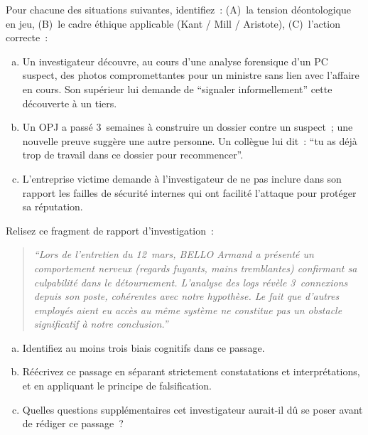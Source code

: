 \bigskip

\begin{boxexo}[title={\ding{45}\quad Exercice~13.1. Identification éthique \niveaubase}]
Pour chacune des situations suivantes, identifiez~: (A)~la tension
déontologique en jeu, (B)~le cadre éthique applicable (Kant / Mill /
Aristote), (C)~l'action correcte~:
\begin{enumerate}[(a)]
    \item Un investigateur découvre, au cours d'une analyse forensique
          d'un PC suspect, des photos compromettantes pour un ministre
          sans lien avec l'affaire en cours. Son supérieur lui demande
          de ``signaler informellement'' cette découverte à un tiers.
    \item Un OPJ a passé 3~semaines à construire un dossier contre un
          suspect~; une nouvelle preuve suggère une autre personne.
          Un collègue lui dit~: ``tu as déjà trop de travail dans ce
          dossier pour recommencer''.
    \item L'entreprise victime demande à l'investigateur de ne pas
          inclure dans son rapport les failles de sécurité internes
          qui ont facilité l'attaque pour protéger sa réputation.
\end{enumerate}
\end{boxexo}

\begin{boxexo}[title={\ding{45}\quad Exercice~13.2. Biais cognitifs \niveaumoyen}]
Relisez ce fragment de rapport d'investigation~:

\begin{quote}
\textit{``Lors de l'entretien du 12~mars, BELLO Armand a présenté un
comportement nerveux (regards fuyants, mains tremblantes) confirmant
sa culpabilité dans le détournement. L'analyse des logs révèle 3~connexions
depuis son poste, cohérentes avec notre hypothèse. Le fait que d'autres
employés aient eu accès au même système ne constitue pas un obstacle
significatif à notre conclusion.''}
\end{quote}

\begin{enumerate}[(a)]
    \item Identifiez au moins trois biais cognitifs dans ce passage.
    \item Réécrivez ce passage en séparant strictement constatations
          et interprétations, et en appliquant le principe de falsification.
    \item Quelles questions supplémentaires cet investigateur aurait-il
          dû se poser avant de rédiger ce passage~?
\end{enumerate}
\end{boxexo}

